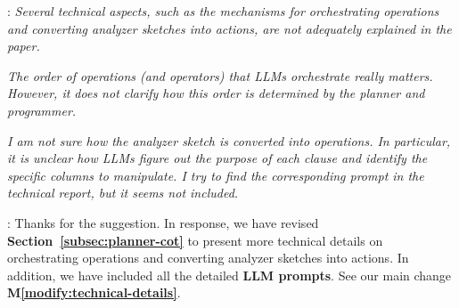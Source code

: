 

\begin{shaded}
{
: 
\emph{Several technical aspects, such as the mechanisms for orchestrating operations and converting analyzer sketches into actions, are not adequately explained in the paper.}

\emph{The order of operations (and operators) that LLMs orchestrate really matters. However, it does not clarify how this order is determined by the planner and programmer.}

\emph{
I am not sure how the analyzer sketch is converted into operations. In particular, it is unclear how LLMs figure out the purpose of each clause and identify the specific columns to manipulate. I try to find the corresponding prompt in the technical report, but it seems not included.
}
%
}
\end{shaded}

: 
Thanks for the suggestion.
In response, we have revised \textbf{Section~\ref{subsec:planner-cot}} to present more technical details on orchestrating operations and converting analyzer sketches into actions. In addition, we have included all the detailed \textbf{LLM prompts}. See our main change \textbf{M\ref{modify:technical-details}}.


